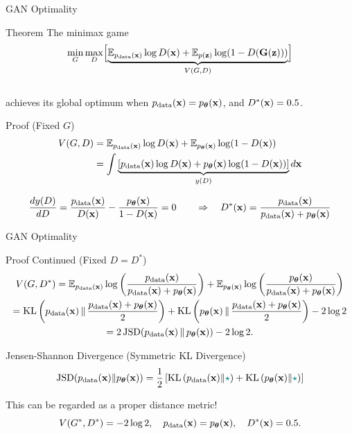 \documentclass{beamer}
\renewcommand{\eqpause}{}
\renewcommand{\nextonslide}[1]{#1}
\begin{document}
\begin{frame}{GAN Optimality}
	\begin{block}{Theorem}
		The minimax game
		\vspace{-0.3cm}
		\[
			\min_{G} \max_D \Bigl[ \underbrace{\mathbb{E}_{p_{\text{data}}(\mathbf{x})} \log D(\mathbf{x}) + \mathbb{E}_{p(\mathbf{z})} \log (1 - D(\mathbf{G}(\mathbf{z})))}_{V(G, D)} \Bigr]
		\]
		\vspace{-0.5cm} \\
		achieves its global optimum when $p_{\text{data}}(\mathbf{x}) = p_{\boldsymbol{\theta}}(\mathbf{x})$, and $D^*(\mathbf{x}) = 0.5$.
	\end{block}
	\eqpause
	\begin{block}{Proof (Fixed $G$)}
		\vspace{-0.5cm}
		\begin{align*}
			V(G, D) &= \bbE_{\pd(\bx)} \log D(\bx) + \bbE_{\pt(\bx)} \log (1 - D(\bx)) \\
			\nextonslide{&= \int \underbrace{\left[ \pd(\bx) \log D(\bx) + \pt(\bx)\log (1 - D(\bx)) \right]}_{y(D)} d \bx}
		\end{align*}
		\eqpause
		\vspace{-0.2cm}
		\[
			\frac{d y(D)}{d D} = \frac{p_{\text{data}}(\mathbf{x})}{D(\mathbf{x})} - \frac{p_{\boldsymbol{\theta}}(\mathbf{x})}{1 - D(\mathbf{x})} = 0 \qquad \Rightarrow \quad D^*(\mathbf{x}) = \frac{p_{\text{data}}(\mathbf{x})}{p_{\text{data}}(\mathbf{x}) + p_{\boldsymbol{\theta}}(\mathbf{x})}
		\]
	\end{block}
\end{frame}
\begin{frame}{GAN Optimality}
	\begin{block}{Proof Continued (Fixed $D = D^*$)}
		\vspace{-0.5cm}
		{\small
		\begin{multline*}
			V(G, D^*) = \bbE_{\pd(\bx)} \log \left( \frac{\pd(\bx)}{\pd(\bx) + \pt(\bx)} \right) + \bbE_{\pt(\bx)} \log \left( \frac{\pt(\bx)}{\pd(\bx) + \pt(\bx)}\right)  \\
		 \nextonslide{= \KL \left(\pd(\bx) \,\|\, \frac{\pd(\bx) + \pt(\bx)}{2}\right) + \KL \left(\pt(\bx) \,\|\, \frac{\pd(\bx) + \pt(\bx)}{2}\right) - 2\log 2 \\}
		 \nextonslide{= 2\,\JSD(\pd(\bx) \,\|\, \pt(\bx)) - 2\log 2.}
		\end{multline*}
		}
	\end{block}
	\eqpause
	\vspace{-0.3cm}
	\begin{block}{Jensen-Shannon Divergence (Symmetric KL Divergence)}
		\vspace{-0.3cm}
		\[
			\mathrm{JSD}(p_{\text{data}}(\mathbf{x}) \| p_{\boldsymbol{\theta}}(\mathbf{x})) = \frac{1}{2} \left[\mathrm{KL} \left(p_{\text{data}}(\mathbf{x}) \| {\color{teal}\star}\right) + \mathrm{KL} \left(p_{\boldsymbol{\theta}}(\mathbf{x}) \| {\color{teal}\star}\right) \right]
		\]
	\end{block}
	\eqpause
	This can be regarded as a proper distance metric!
	\[
		V(G^*, D^*) = -2\log 2, \quad p_{\text{data}}(\mathbf{x}) = p_{\boldsymbol{\theta}}(\mathbf{x}), \quad  D^*(\mathbf{x}) = 0.5.
	\]
\end{frame}
\end{document}
